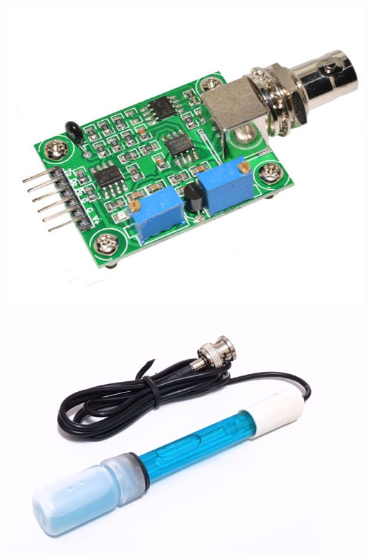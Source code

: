                 \begin{minipage}{0.95\textwidth}
                    \begin{center}
                    \includegraphics[scale=0.25]{hardware/phmoduloplaca.jpg}
                    \label{BoardPh}
                    \end{center}
                \end{minipage}
                
                \begin{minipage}{0.95\textwidth}
                    \begin{center}
                    \includegraphics[scale=0.35]{hardware/electrododepH.jpg}
                    \label{phElectrode}
                    \end{center}
                \end{minipage}
                
